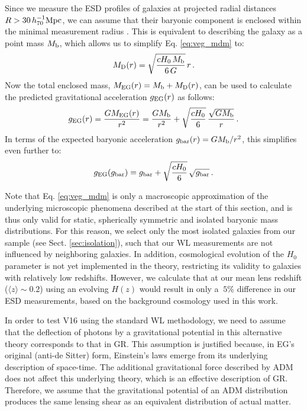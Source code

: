 \documentclass[fleqn,usenatbib]{mnras}
\newcommand{\hsMpc}{\, h_{70}^{-1}{\rm{Mpc}} }
\newcommand{\un}[1]{_{\rm #1}}
\begin{document}
Since we measure the ESD profiles of galaxies at projected radial distances $R>30 \hsMpc$, we can assume that their baryonic component is enclosed within the minimal measurement radius \cite[see also][]{brouwer2017}. This is equivalent to describing the galaxy as a point mass $M\un{b}$, which allows us to simplify Eq. \ref{eq:veg_mdm} to:
\begin{equation}
M_{\rm D}(r)=\sqrt{\frac{cH_{0} \, M_{\rm b}}{6 \, G}} \, r \, .
\end{equation}
Now the total enclosed mass, $M\un{EG}(r) = M\un{b} + M\un{D}(r)$, can be used to calculate the predicted gravitational acceleration $g\un{EG}(r)$ as follows:
\begin{equation}
	g_{\rm EG}(r) = \frac{G M\un{EG}(r)}{r^2} = \frac{G M\un{b}}{r^2} + \sqrt{\frac{cH_{0}}{6}} \, \frac{\sqrt{G M_{\rm b}}}{r} \, .
\end{equation}
In terms of the expected baryonic acceleration $g\un{bar}(r) = G M\un{b}/r^2$, this simplifies even further to:
\begin{equation}
g_{\rm EG}(g\un{bar}) = g\un{bar} + \sqrt{\frac{cH_{0}}{6}} \, \sqrt{g\un{bar}} \, .
\end{equation}

Note that Eq. \ref{eq:veg_mdm} is only a macroscopic approximation of the underlying microscopic phenomena described at the start of this section, and is thus only valid for static, spherically symmetric and isolated baryonic mass distributions. For this reason, we select only the most isolated galaxies from our sample (see Sect. \ref{sec:isolation}), such that our WL measurements are not influenced by neighboring galaxies. In addition, cosmological evolution of the $H_0$ parameter is not yet implemented in the theory, restricting its validity to galaxies with relatively low redshifts. However, we calculate that at our mean lens redshift ($\langle z \rangle \sim 0.2$) using an evolving $H(z)$ would result in only a $~5\%$ difference in our ESD measurements, based on the background cosmology used in this work.

In order to test V16 using the standard WL methodology, we need to assume that the deflection of photons by a gravitational potential in this alternative theory corresponds to that in GR. This assumption is justified because, in EG's original (anti-de Sitter) form, Einstein's laws emerge from its underlying description of space-time. The additional gravitational force described by ADM does not affect this underlying theory, which is an effective description of GR. Therefore, we assume that the gravitational potential of an ADM distribution produces the same lensing shear as an equivalent distribution of actual matter.
\end{document}

